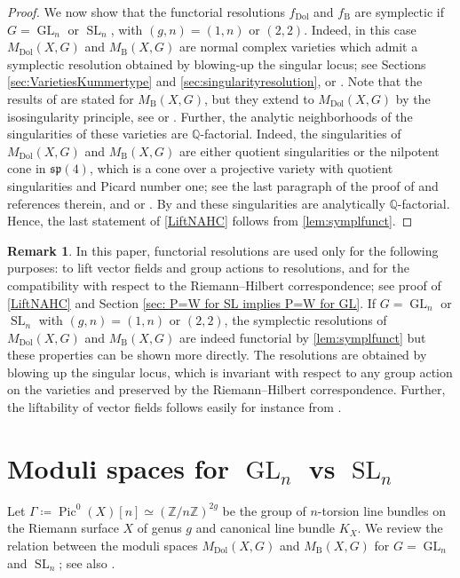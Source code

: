 \documentclass[JEP,XML,SOM,Unicode, NoEqCountersInSection,NoFloatCountersInSection,published]{cedram}
\theoremstyle{definition}
\newtheorem{rmk}[thm]{Remark}
\newcommand{\QQ}{\mathbb{Q}}
\newcommand{\ZZ}{\mathbb{Z}}
\newcommand{\Gl}{\operatorname{GL}}
\newcommand{\Sl}{\operatorname{SL}}
\newcommand{\Pic}{\operatorname{Pic}}
\newcommand{\MDolG}{{M}_{\mathrm{Dol}}(X,G)}
\newcommand{\MBG}{{M}_{\mathrm{B}}(X,G)}
\begin{document}
\begin{proof}
We now show that the functorial resolutions $f_{\mathrm{Dol}}$ and $f_{\mathrm{B}}$ are symplectic if $G=\Gl_n$ or $\Sl_n$, with $(g,n)=(1,n)$ or $(2,2)$. Indeed, in this case $\MDolG$ and $\MBG$ are normal complex varieties which admit a symplectic resolution obtained by blowing-up the singular locus; see Sections \ref{sec:VarietiesKummertype} and \ref{sec:singularityresolution}, or \cite[Th.\,1.8]{BellamySchedler2019}. Note that the results of \cite{BellamySchedler2019} are stated for $\MBG$, but they extend to $\MDolG$ by the isosingularity principle, see \cite[Th.\,10.6]{Simpson1994} or \cite[\S 2.4 and the first paragraph of \S 3.2]{Mauri2021}. Further, the analytic neighborhoods of the singularities of these varieties are $\QQ$-factorial. Indeed, the singularities of $\MDolG$ and $\MBG$ are either quotient singularities or the nilpotent cone in $\mathfrak{sp}(4)$, which is a cone over a projective variety with quotient singularities and Picard number one; see the last paragraph of the proof of \cite[Th.\,1.3]{BellamySchedler2019} and references therein, and \cite[Lem.\,1.3]{MRS18} or \cite[\S 3.4]{Mauri2021}. By \cite[Prop.\,5.15]{KollarMori1998} and \cite[Prop.\,7.4]{K13} these singularities are analytically $\QQ$-factorial. Hence, the last statement of \cref{LiftNAHC} follows from \cref{lem:symplfunct}.
\end{proof}

\begin{rmk}
In this paper, functorial resolutions are used only for the following purposes: to lift vector fields and group actions to resolutions, and for the compatibility with respect to the Riemann--Hilbert correspondence; see proof of \cref{LiftNAHC} and Section \ref{sec: P=W for SL implies P=W for GL}. If $G=\Gl_n$ or $\Sl_n$ with $(g,n)=(1,n)$ or $(2,2)$, the symplectic resolutions of $\MDolG$ and $\MBG$ are indeed functorial by \cref{lem:symplfunct} but these properties can be shown more directly. The resolutions are obtained by blowing up the singular locus, which is invariant with respect to any group action on the varieties and preserved by the Riemann--Hilbert correspondence. Further, the liftability of vector fields follows easily for instance from \cite[Lem.\,5.3]{AV21}.
\end{rmk}

\section{Moduli spaces for \texorpdfstring{$\Gl_n$}{Gln} vs \texorpdfstring{$\Sl_n$}{Sln}}\label{sec:modulispacesforGlSl}
Let $\Gamma \coloneqq \Pic^0(X)[n] \simeq (\ZZ/n\ZZ)^{2g}$ be the group of $n$-torsion line bundles on the Riemann surface $X$ of genus $g$ and canonical line bundle $K_X$. We review the relation between the moduli spaces $\MDolG$ and $\MBG$ for $G=\Gl_n$ and $\Sl_n$; see also \cite{Hitchin1987, Simpson1994, Simpson1994I}.
\end{document}
